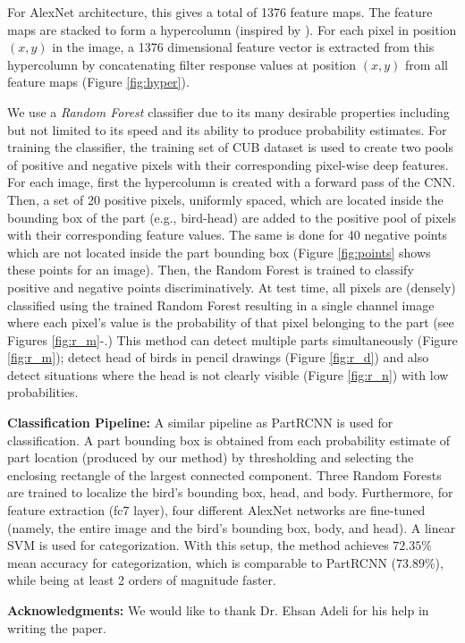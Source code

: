 \documentclass[10pt,twocolumn,letterpaper]{article}
\begin{document}
For AlexNet architecture, this gives a total of 1376 feature maps. The feature maps are stacked to form a hypercolumn (inspired by \cite{hypercolumn}). For each pixel in position $(x,y)$ in the image, a 1376 dimensional feature vector is extracted from this hypercolumn by concatenating filter response values at position $(x,y)$ from all feature maps (Figure \ref{fig:hyper}).

We use a {\it Random Forest} classifier due to its many desirable properties \cite{rf_book} including but not limited to its speed and its ability to produce probability estimates. For training the classifier, the training set of CUB \cite{cub} dataset is used to create two pools of positive and negative pixels with their corresponding pixel-wise deep features. For each image, first the hypercolumn is created with a forward pass of the CNN. Then, a set of 20 positive pixels, uniformly spaced, which are located inside the bounding box of the part (e.g., bird-head) are added to the positive pool of pixels with their corresponding feature values. The same is done for 40 negative points which are not located inside the part bounding box (Figure \ref{fig:points} shows these points for an image). Then, the Random Forest is trained to classify positive and negative points discriminatively. At test time, all pixels are (densely) classified using the trained Random Forest resulting in a single channel image where each pixel's value is the probability of that pixel belonging to the part (see Figures \ref{fig:r_m}-.) This method can detect multiple parts simultaneously (Figure \ref{fig:r_m}); detect head of birds in pencil drawings (Figure \ref{fig:r_d}) and also detect situations where the head is not clearly visible (Figure \ref{fig:r_n}) with low probabilities.

\textbf{Classification Pipeline:}
A similar pipeline as PartRCNN \cite{partrcnn} is used for classification.
A part bounding box is obtained from each probability estimate of part location (produced by our method) by thresholding and selecting the enclosing rectangle of the largest connected component.
Three Random Forests are trained to localize the bird's bounding box, head, and body. Furthermore, for feature extraction (fc7 layer), four different AlexNet networks are fine-tuned (namely, the entire image and the bird's bounding box, body, and head). 
A linear SVM is used for categorization. With this setup, the method achieves $72.35\%$ mean accuracy for categorization, which is comparable to PartRCNN \cite{partrcnn} ($73.89\%$), while being at least 2 orders of magnitude faster.

\textbf{Acknowledgments:}
We would like to thank Dr. Ehsan Adeli for his help in writing the paper.

{\scriptsize


}
\end{document}
